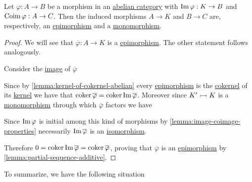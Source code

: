 \documentclass[../../../main]{subfiles}
\begin{document}
\begin{lemma}
  Let \(\varphi: A \to B\) be a morphism in an \hyperref[def:abelian-category]{abelian category} with \(\operatorname*{Im} \varphi: K \to B\) and \(\operatorname*{Coim} \varphi: A \to C\).
  Then the induced morphisms \(A \to K\) and \(B \to C\) are, respectively, an \hyperref[def:mono-epi-morphism]{epimorphism} and a \hyperref[def:mono-epi-morphism]{monomorphism}.
\end{lemma}
\begin{proof}
  We will see that \(\overline{\varphi}: A \to K\) is a \hyperref[def:mono-epi-morphism]{epimorphism}. The other statement follows analogously.

  Consider the \hyperref[def:image-coimage]{image} of \(\overline{\varphi}\)
  \begin{center}
  \end{center}
  Since by \autoref{lemma:kernel-of-cokernel-abelian} every \hyperref[def:mono-epi-morphism]{epimorphism} is the \hyperref[def:categorical-cokernel]{cokernel} of its \hyperref[def:categorical-kernel]{kernel} we have that \(\operatorname*{coker} \overline{\varphi} = \operatorname*{coker} \operatorname*{Im} \overline{\varphi}\).
  Moreover since \(K' \rightarrowtail K\) is a \hyperref[def:mono-epi-morphism]{monomorphism} through which \(\overline{\varphi}\) factors we have
   \begin{center}
  \end{center}
  Since \(\operatorname*{Im} \varphi\) is initial among this kind of morphisms by \autoref{lemma:image-coimage-properties} necessarily \(\operatorname*{Im} \overline{\varphi}\) is an \hyperref[def:categorical-isomorphism]{isomorphism}.

  Therefore \(0 = \operatorname*{coker} \operatorname*{Im} \overline{\varphi} = \operatorname*{coker} \overline{\varphi}\), proving that \(\overline{\varphi}\) is an \hyperref[def:mono-epi-morphism]{epimorphism} by \autoref{lemma:partial-sequence-additive}.
\end{proof}

To summarize, we have the following situation
\begin{center}
\end{center}
\end{document}
